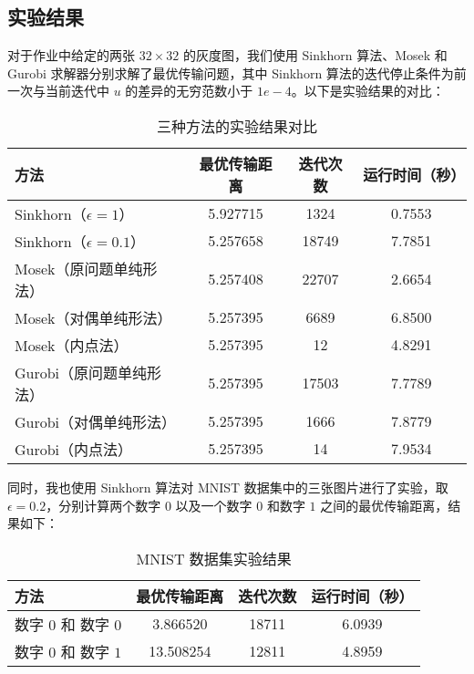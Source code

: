 \documentclass{article}
\begin{document}
\subsection{实验结果}
对于作业中给定的两张 $32\times32$ 的灰度图，我们使用 Sinkhorn 算法、Mosek 和 Gurobi 求解器分别求解了最优传输问题，其中 Sinkhorn 算法的迭代停止条件为前一次与当前迭代中 $u$ 的差异的无穷范数小于 $1e-4$。以下是实验结果的对比：
\begin{table}[h]
    \centering
    \begin{tabular}{l|c|c|c}
        \toprule
        \hline
        方法 & 最优传输距离 & 迭代次数 & 运行时间（秒） \\
        \hline
        Sinkhorn（$\epsilon=1$） & 5.927715 & 1324 & 0.7553 \\
        \hline
        Sinkhorn（$\epsilon=0.1$） & 5.257658 & 18749 & 7.7851 \\
        \hline
        Mosek（原问题单纯形法） & 5.257408 & 22707 & 2.6654 \\
        \hline
        Mosek（对偶单纯形法） & 5.257395 & 6689 & 6.8500 \\
        \hline
        Mosek（内点法） & 5.257395 & 12 & 4.8291 \\
        \hline
        Gurobi（原问题单纯形法） & 5.257395 & 17503 & 7.7789 \\
        \hline
        Gurobi（对偶单纯形法） & 5.257395 & 1666 & 7.8779 \\
        \hline
        Gurobi（内点法） & 5.257395 & 14 & 7.9534 \\
        \hline
        \bottomrule
    \end{tabular}
    \caption{三种方法的实验结果对比}
\end{table}

同时，我也使用 Sinkhorn 算法对 MNIST 数据集中的三张图片进行了实验，取 $\epsilon=0.2$，分别计算两个数字 $0$ 以及一个数字 $0$ 和数字 $1$ 之间的最优传输距离，结果如下：

\begin{table}[h]
    \centering
    \begin{tabular}{l|c|c|c}
        \toprule
        \hline
        方法 & 最优传输距离 & 迭代次数 & 运行时间（秒） \\
        \hline
        数字 $0$ 和 数字 $0$ & 3.866520 & 18711 & 6.0939 \\
        \hline
        数字 $0$ 和 数字 $1$ & 13.508254 & 12811 & 4.8959 \\
        \hline
        \bottomrule
    \end{tabular}
    \caption{MNIST 数据集实验结果}
\end{table}
\end{document}
